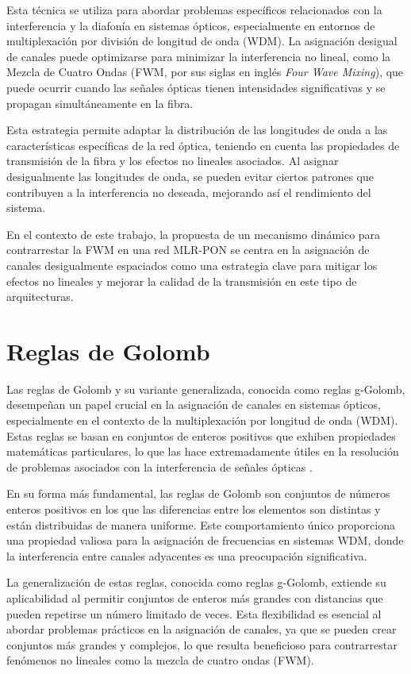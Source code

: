 Esta técnica se utiliza para abordar problemas específicos relacionados con la interferencia y la diafonía en sistemas ópticos, especialmente en entornos de multiplexación por división de longitud de onda (WDM). La asignación desigual de canales puede optimizarse para minimizar la interferencia no lineal, como la Mezcla de Cuatro Ondas (FWM, por sus siglas en inglés \textit{Four Wave Mixing}), que puede ocurrir cuando las señales ópticas tienen intensidades significativas y se propagan simultáneamente en la fibra.

Esta estrategia permite adaptar la distribución de las longitudes de onda a las características específicas de la red óptica, teniendo en cuenta las propiedades de transmisión de la fibra y los efectos no lineales asociados. Al asignar desigualmente las longitudes de onda, se pueden evitar ciertos patrones que contribuyen a la interferencia no deseada, mejorando así el rendimiento del sistema.

En el contexto de este trabajo, la propuesta de un mecanismo dinámico para contrarrestar la FWM en una red MLR-PON se centra en la asignación de canales desigualmente espaciados como una estrategia clave para mitigar los efectos no lineales y mejorar la calidad de la transmisión en este tipo de arquitecturas.


\section{Reglas de Golomb}
Las reglas de Golomb y su variante generalizada, conocida como reglas g-Golomb, desempeñan un papel crucial en la asignación de canales en sistemas ópticos, especialmente en el contexto de la multiplexación por longitud de onda (WDM). Estas reglas se basan en conjuntos de enteros positivos que exhiben propiedades matemáticas particulares, lo que las hace extremadamente útiles en la resolución de problemas asociados con la interferencia de señales ópticas \cite{Apostolos}.

En su forma más fundamental, las reglas de Golomb son conjuntos de números enteros positivos en los que las diferencias entre los elementos son distintas y están distribuidas de manera uniforme. Este comportamiento único proporciona una propiedad valiosa para la asignación de frecuencias en sistemas WDM, donde la interferencia entre canales adyacentes es una preocupación significativa.

La generalización de estas reglas, conocida como reglas g-Golomb, extiende su aplicabilidad al permitir conjuntos de enteros más grandes con distancias que pueden repetirse un número limitado de veces. Esta flexibilidad es esencial al abordar problemas prácticos en la asignación de canales, ya que se pueden crear conjuntos más grandes y complejos, lo que resulta beneficioso para contrarrestar fenómenos no lineales como la mezcla de cuatro ondas (FWM).

